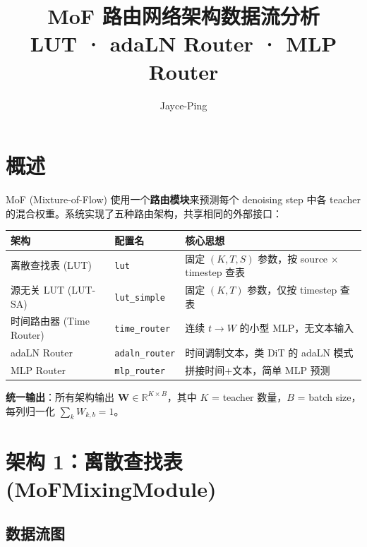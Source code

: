 \documentclass[11pt,a4paper]{article}
\title{\textbf{MoF 路由网络架构数据流分析}\\[0.3em]
\large LUT · adaLN Router · MLP Router}
\author{Jayce-Ping}
\date{}
\newcommand{\R}{\mathbb{R}}
\begin{document}
\maketitle

\section{概述}

MoF (Mixture-of-Flow) 使用一个\textbf{路由模块}来预测每个 denoising step 中各 teacher 的混合权重。系统实现了五种路由架构，共享相同的外部接口：

\begin{center}
\begin{tabular}{lll}
\toprule
\textbf{架构} & \textbf{配置名} & \textbf{核心思想} \\
\midrule
离散查找表 (LUT) & \texttt{lut} & 固定 $(K, T, S)$ 参数，按 source × timestep 查表 \\
源无关 LUT (LUT-SA) & \texttt{lut\_simple} & 固定 $(K, T)$ 参数，仅按 timestep 查表 \\
时间路由器 (Time Router) & \texttt{time\_router} & 连续 $t \to W$ 的小型 MLP，无文本输入 \\
adaLN Router & \texttt{adaln\_router} & 时间调制文本，类 DiT 的 adaLN 模式 \\
MLP Router & \texttt{mlp\_router} & 拼接时间+文本，简单 MLP 预测 \\
\bottomrule
\end{tabular}
\end{center}

\textbf{统一输出}：所有架构输出 $\mathbf{W} \in \R^{K \times B}$，其中 $K$ = teacher 数量，$B$ = batch size，每列归一化 $\sum_k W_{k,b} = 1$。

\section{架构 1：离散查找表 (MoFMixingModule)}

\subsection{数据流图}
\end{document}

